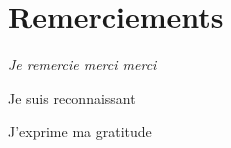 \chapter*{\huge Remerciements}

\begin{center}
\it \Large
    Je remercie merci merci
    
    Je suis reconnaissant
    
    J'exprime ma gratitude
\end{center}